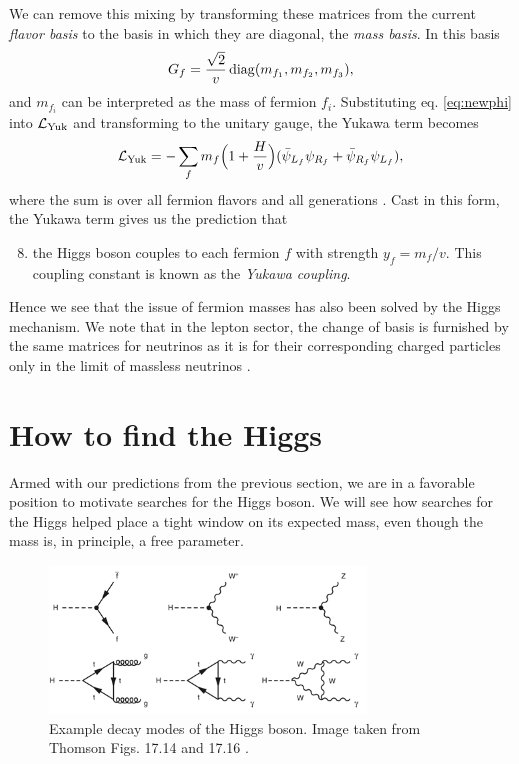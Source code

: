 We can remove this mixing by transforming these matrices from the current 
{\it flavor basis} to the basis in which they are diagonal, the {\it mass 
basis}. In this basis
\begin{equation}
  G_f=\frac{\sqrt{2}}{v}\mathop{\mathrm{diag}}(m_{f_1},m_{f_2},m_{f_3}), 
\end{equation}
and $m_{f_i}$ can be interpreted as the mass of fermion $f_i$. Substituting
eq. \eqref{eq:newphi} into $\mathcal{L}_{\rm Yuk}$ and transforming to the 
unitary gauge, the Yukawa term becomes
\begin{equation}
  \mathcal{L}_{\rm Yuk}=-\sum\limits_{f}m_{f}\Big(1+\frac{H}{v}\Big)
            (\bar{\psi}_{L_f}\psi_{R_f}+\bar{\psi}_{R_f}\psi_{L_f}),
\end{equation} 
where the sum is over all fermion flavors and all generations 
\cite{dittmaier_higgs_2013}. Cast
in this form, the Yukawa term gives us the prediction that
\begin{enumerate}
  \setcounter{enumi}{7}
  \item the Higgs boson couples to each fermion $f$ with strength $y_f=m_f/v$.
        This coupling constant is known as the {\it Yukawa coupling}.
\end{enumerate}
Hence we see that the issue of fermion masses has also been solved by the
Higgs mechanism. We note that in the lepton sector, the
change of basis is furnished by the same matrices for neutrinos as it is for
their corresponding charged particles only in the limit of massless neutrinos
\cite{dittmaier_higgs_2013}.


\section{How to find the Higgs}
Armed with our predictions from the previous section, we are in a favorable
position to motivate searches for the Higgs boson. We will see how searches for
the Higgs helped place a tight window on its expected mass, even though the 
mass is, in principle, a free parameter.
\begin{figure}
  \centering
  \includegraphics[width=0.75\textwidth,height=0.75\textheight,keepaspectratio]
                {pictures/higgs_decays.png}
  \caption{Example decay modes of the Higgs boson. Image taken from Thomson
           Figs. 17.14 and 17.16  \cite{thomson_modern_2013}.}
  \label{fig:exhiggsdecays}
\end{figure}


